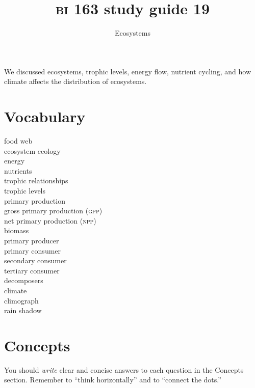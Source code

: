 \documentclass[letterpaper]{tufte-handout}
\title{{\scshape bi} 163 study guide 19}
\author{Ecosystems}
\date{} %
\begin{document}
\maketitle	%

We discussed ecosystems, trophic levels, energy flow, nutrient cycling, and how climate affects the distribution of ecosystems.

\section*{Vocabulary}

\vspace{-1\baselineskip}
\begin{multicols}{2}
food web\\
ecosystem ecology\\
energy \\
nutrients \\
trophic relationships\\
trophic levels\\
primary production\\
gross primary production (\textsc{gpp})\\
net primary production (\textsc{npp})\\
biomass\\
primary producer\\
primary consumer\\
secondary consumer\\
tertiary consumer\\
decomposers\\
climate \\
climograph \\
rain shadow
\end{multicols}

\section*{Concepts}

You should \emph{write} clear and concise answers to each question in the Concepts section.  Remember to ``think horizontally'' and to ``connect the dots.'' 
\end{document}
